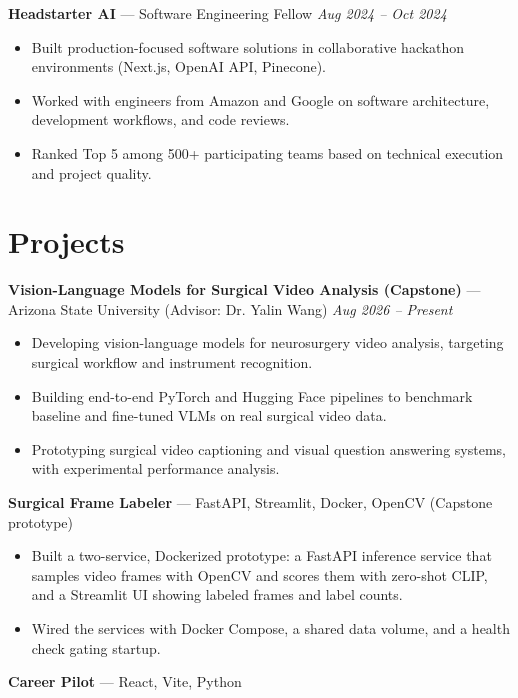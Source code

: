 \documentclass[a4paper,8pt]{extarticle}
\begin{document}
\noindent
\textbf{Headstarter AI} --- Software Engineering Fellow
\hfill \textit{Aug 2024 -- Oct 2024}

\begin{itemize}
\item Built production-focused software solutions in collaborative hackathon environments (Next.js, OpenAI API, Pinecone).
\item Worked with engineers from Amazon and Google on software architecture, development workflows, and code reviews.
\item Ranked Top 5 among 500+ participating teams based on technical execution and project quality.
\end{itemize}

\section*{Projects}

\noindent
\textbf{Vision-Language Models for Surgical Video Analysis (Capstone)} --- Arizona State University (Advisor: Dr. Yalin Wang)
\hfill \textit{Aug 2026 -- Present}

\begin{itemize}
\item Developing vision-language models for neurosurgery video analysis, targeting surgical workflow and instrument recognition.
\item Building end-to-end PyTorch and Hugging Face pipelines to benchmark baseline and fine-tuned VLMs on real surgical video data.
\item Prototyping surgical video captioning and visual question answering systems, with experimental performance analysis.
\end{itemize}

\noindent
\textbf{Surgical Frame Labeler} --- FastAPI, Streamlit, Docker, OpenCV (Capstone prototype)

\begin{itemize}
\item Built a two-service, Dockerized prototype: a FastAPI inference service that samples video frames with OpenCV and scores them with zero-shot CLIP, and a Streamlit UI showing labeled frames and label counts.
\item Wired the services with Docker Compose, a shared data volume, and a health check gating startup.
\end{itemize}

\noindent
\textbf{Career Pilot} --- React, Vite, Python
\end{document}
